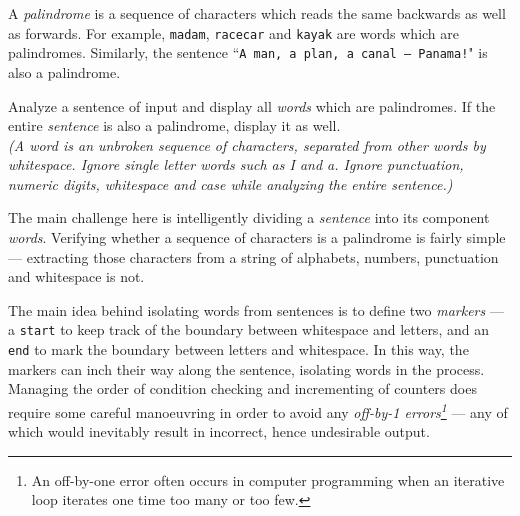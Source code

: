 

\problem A {\em palindrome} is a sequence of characters which reads the same backwards as well as forwards.
For example, {\tt madam}, {\tt racecar} and {\tt kayak} are words which are palindromes. Similarly, the sentence ``{\tt A man, a plan, a canal -- Panama!}" is also a palindrome.

Analyze a sentence of input and display all {\em words} which are palindromes. If the entire {\em sentence} is also a palindrome, display it as well.\\

{\em (A word is an unbroken sequence of characters, separated from other words by whitespace. Ignore single letter words such as {\em I} and {\em a}.
Ignore punctuation, numeric digits, whitespace and case while analyzing the entire sentence.)}

\solution The main challenge here is intelligently dividing a {\em sentence} into its component {\em words}. Verifying whether a sequence of characters is a palindrome is fairly simple --- extracting those characters from a string of alphabets, numbers, punctuation and whitespace is not.

The main idea behind isolating words from sentences is to define two {\em markers} --- a {\tt start} to keep track of the boundary between whitespace and letters, and an {\tt end} to mark the boundary between letters and whitespace. In this way, the markers can inch their way along the sentence, isolating words in the process. Managing the order of condition checking and incrementing of counters does require some careful manoeuvring in order to avoid any {\em off-by-1 errors\footnote{An off-by-one error often occurs in computer programming when an iterative loop iterates one time too many or too few.}} ---  any of which would inevitably result in incorrect, hence undesirable output.\citeneeded

